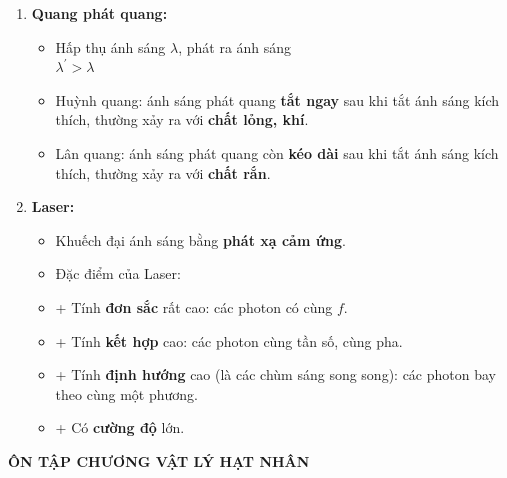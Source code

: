 \documentclass[a4paper,12pt,titlepage,twocolumn]{article}
\newenvironment{myitemize} 
{ \begin{itemize}[leftmargin=*,label=-]  %
		\setlength{\itemsep}{0pt}
		\setlength{\parskip}{0pt}
		\setlength{\parsep}{0pt}     }
{ \end{itemize}                  }
\newenvironment{myenumerate}
{ \begin{enumerate}[label=\textbf{\arabic*}.]
\setlist{nolistsep} %
\setlength{\itemsep}{0pt}
\setlength{\parskip}{0pt}
\setlength{\parsep}{0pt}	}
{ \end{enumerate}}
\begin{document}
\begin{myenumerate}
\begin{myitemize}
	\end{myitemize}
	\textepsilon{} $=hf=\dfrac{hc}{\lambda}=E_{n} - E_{m}$ \\
	số vạch max $=\dfrac{n(n-1)}{2}$ \\
	$F = \dfrac{ke^2}{r^2} = ma_{ht} = \dfrac{mv^2}{r}$ \\
	Tia X: $\dfrac{hc}{\lambda_{min}} = hf_{max} = eU_{AK} = W_{\textit{đ}A}$
	\item \textbf{Quang phát quang:}
	\begin{myitemize}
		\item Hấp thụ ánh sáng $\lambda$, phát ra ánh sáng \\ $\lambda^\prime > \lambda$
		\item Huỳnh quang: ánh sáng phát quang \textbf{tắt ngay} sau khi tắt ánh sáng kích thích, thường xảy ra với \textbf{chất lỏng, khí}.
		\item Lân quang: ánh sáng phát quang còn \textbf{kéo dài} sau khi tắt ánh sáng kích thích, thường xảy ra với \textbf{chất rắn}. \\
	\end{myitemize} 
	\item \textbf{Laser:}
	\begin{myitemize}
		\item Khuếch đại ánh sáng bằng \textbf{phát xạ cảm ứng}.
		\item Đặc điểm của Laser:
		\setlength{\itemindent}{0.5cm} %
		\item[+] Tính \textbf{đơn sắc} rất cao: các photon có cùng $f$.
		\item[+] Tính \textbf{kết hợp} cao: các photon cùng tần số, cùng pha.
		\item[+] Tính \textbf{định hướng} cao (là các chùm sáng song song): các photon bay theo cùng một phương.
		\item[+] Có \textbf{cường độ} lớn.
	\end{myitemize}
\end{myenumerate}	
\begin{adjustwidth}{-0.2cm}{}
	\begin{center}
		\small\textbf{ÔN TẬP CHƯƠNG VẬT LÝ HẠT NHÂN}
	\end{center}
\end{adjustwidth}
\end{document}
